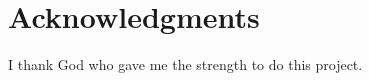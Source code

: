 

\chapter*{Acknowledgments}\label{ch:acknowledgments}


I thank God who gave me the strength to do this project.

